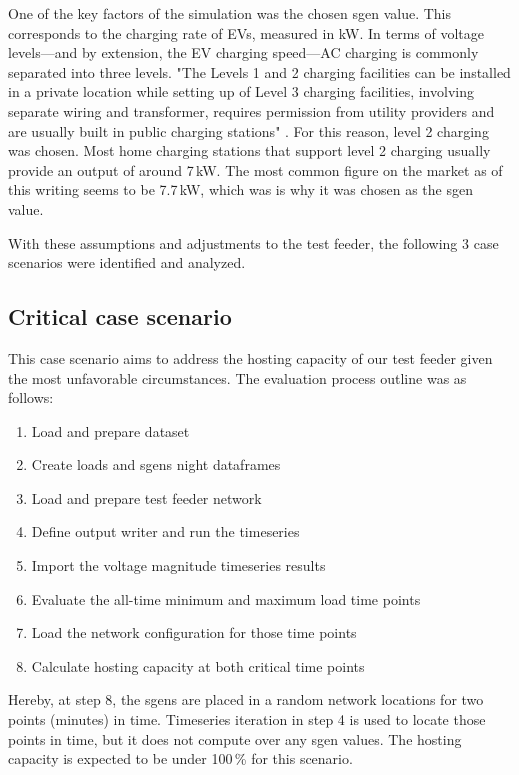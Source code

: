 \documentclass[a4paper,10pt]{report}
\begin{document}
One of the key factors of the simulation was the chosen sgen value. This corresponds to the charging rate of EVs, measured in kW. In terms of voltage levels---and by extension, the EV charging speed---AC charging is commonly separated into three levels. "The Levels 1 and 2 charging facilities can be installed in a private location while setting up of Level 3 charging facilities, involving separate wiring and transformer, requires permission from utility providers and are usually built in public charging stations" \cite{Das2020}. For this reason, level 2 charging was chosen. Most home charging stations that support level 2 charging usually provide an output of around 7\,kW. The most common figure on the market as of this writing seems to be 7.7\,kW, which was is why it was chosen as the sgen value.

With these assumptions and adjustments to the test feeder, the following 3 case scenarios were identified and analyzed.

\subsection{Critical case scenario}
This case scenario aims to address the hosting capacity of our test feeder given the most unfavorable circumstances. The evaluation process outline was as follows:
\begin{enumerate}
	\item Load and prepare dataset
	\item Create loads and sgens night dataframes
	\item Load and prepare test feeder network
	\item Define output writer and run the timeseries
	\item Import the voltage magnitude timeseries results
	\item Evaluate the all-time minimum and maximum load time points
	\item Load the network configuration for those time points
	\item Calculate hosting capacity at both critical time points
\end{enumerate}

Hereby, at step 8, the sgens are placed in a random network locations for two points (minutes) in time. Timeseries iteration in step 4 is used to locate those points in time, but it does not compute over any sgen values. The hosting capacity is expected to be under 100\,\% for this scenario.
\end{document}
